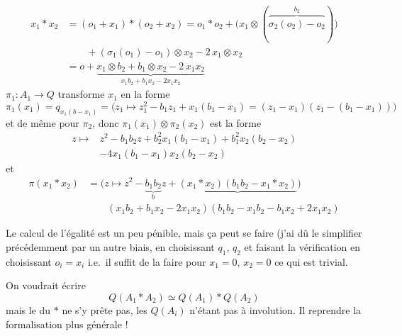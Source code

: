 \documentclass[11pt,a4paper]{article}
\begin{document}
\begin{align*}
  x_1 \ast x_2 &= (o_1 + x_1) \ast (o_2 + x_2)
    = o_1 \ast o_2 + \bigl(x_1 \otimes (\overbrace{\sigma_2(o_2) - o_2}^{b_2})\bigr) \\
  &\qquad + (\sigma_1(o_1) - o_1) \otimes x_2 - 2\, x_1 \otimes x_2 \\
  &= o + \underbrace{x_1 \otimes b_2 + b_1 \otimes x_2 - 2\, x_1 x_2}_{x_1 b_2 + b_1 x_2 - 2 x_1 x_2}
\end{align*}
$\pi_1 : A_1 \to Q$ transforme $x_1$ en la forme
\[
  \pi_1(x_1) = q_{x_1(b - x_1)} =
  \bigl(z_1 \mapsto z_1^2 - b_1 z_1 + x_1(b_1 - x_1) = (z_1 - x_1)(z_1 - (b_1 - x_1))\bigr)
\]
et de même pour $\pi_2$, donc $\pi_1(x_1) \otimes \pi_2(x_2)$ est la forme
\begin{align*}
  z \longmapsto{}& z^2 - b_1 b_2 z + b_2^2 x_1(b_1 - x_1) + b_1^2 x_2 (b_2 - x_2) \\
  &- 4 x_1 (b_1 - x_1) x_2 (b_2 - x_2)
\end{align*}
et
\begin{align*}
  \pi(x_1 \ast x_2) &= \bigl(z \mapsto z^2 - \underbrace{b_1 b_2}_{b} z
     + \underbrace{(x_1 \ast x_2)(b_1 b_2 - x_1 \ast x_2)}\bigr) \\
  &\qquad (x_1 b_2 + b_1 x_2 - 2 x_1 x_2)(b_1 b_2 - x_1 b_2 - b_1 x_2 + 2 x_1 x_2)
\end{align*}

Le calcul de l'égalité est un peu pénible, mais ça peut se faire (j'ai dû le simplifier précédemment par un autre biais, en choisissant $q_1$, $q_2$ et faisant la vérification en choisissant $o_i = x_i$  i.e.\ il suffit de la faire pour $x_1 = 0$, $x_2 = 0$ ce qui est trivial.

On voudrait écrire 
\[
  Q(A_1 \ast A_2) \simeq Q(A_1) \ast Q(A_2)
\]
mais le  du $\ast$   ne s'y prête pas,  les $Q(A_i)$ n'étant pas à involution. Il  reprendre \ill{}  la formalisation   plus générale !
\end{document}
